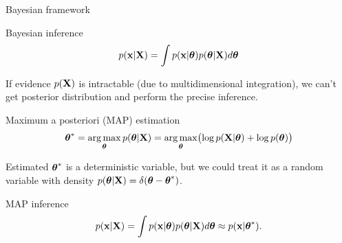 \begin{frame}{Bayesian framework}
	\begin{block}{Bayesian inference}
		\vspace{-0.3cm}
		\[
			p(\mathbf{x} | \mathbf{X}) = \int p(\mathbf{x} | \boldsymbol{\theta}) p(\boldsymbol{\theta} | \mathbf{X}) d \boldsymbol{\theta}
		\]
		\vspace{-0.3cm}
	\end{block}
	If evidence $p(\mathbf{X})$ is intractable (due to multidimensional integration), we can't get posterior distribution and perform the precise inference.
    \begin{block}{Maximum a posteriori (MAP) estimation}
	    \vspace{-0.3cm}
	    \[
	        \boldsymbol{\theta}^* = \operatorname*{arg\,max}_{\boldsymbol{\theta}} p(\boldsymbol{\theta} | \mathbf{X}) = \operatorname*{arg\,max}_{\boldsymbol{\theta}} \bigl(\log p(\mathbf{X} | \boldsymbol{\theta}) + \log p(\boldsymbol{\theta}) \bigr)
	    \]
	     \vspace{-0.3cm}
    \end{block}
	Estimated $\boldsymbol{\theta}^*$ is a deterministic variable, but we could treat it as a random variable with density $p(\boldsymbol{\theta} | \mathbf{X}) = \delta(\boldsymbol{\theta} - \boldsymbol{\theta}^*)$.
	\begin{block}{MAP inference}
		\[
			p(\mathbf{x} | \mathbf{X}) = \int p(\mathbf{x}| \boldsymbol{\theta}) p(\boldsymbol{\theta} | \mathbf{X} ) d \boldsymbol{\theta} \approx p(\mathbf{x} | \boldsymbol{\theta}^*).
		\]
	\end{block}
\end{frame}
